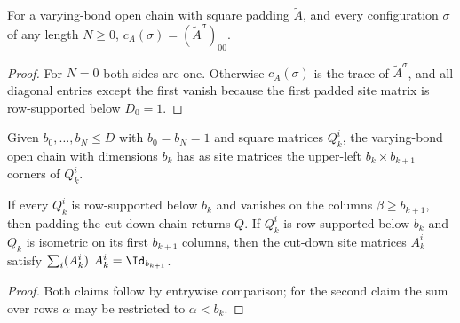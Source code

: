 \begin{lemma}
    \label{thm:seqanc_coeff_corner}
    \leanok
    For a varying-bond open chain with square padding $\widetilde A$, and
    every configuration $\sigma$ of any length $N\ge 0$,
    $c_A(\sigma)=(\widetilde A^\sigma)_{00}$.
\end{lemma}
\begin{proof}
    \leanok
    For $N=0$ both sides are one. Otherwise $c_A(\sigma)$ is the trace of
    $\widetilde A^\sigma$, and all diagonal entries except the first vanish
    because the first padded site matrix is row-supported below $D_0=1$.
\end{proof}

\begin{definition}
    \label{def:seqanc_cut_down}
    \leanok
    Given $b_0,\dots,b_N\le D$ with $b_0=b_N=1$ and square matrices $Q_k^i$,
    the varying-bond open chain with dimensions $b_k$ has as site matrices
    the upper-left $b_k\times b_{k+1}$ corners of $Q_k^i$.
\end{definition}

\begin{lemma}
    \label{thm:seqanc_cut_down}
    \leanok
    If every $Q_k^i$ is row-supported below $b_k$ and vanishes on the
    columns $\beta\ge b_{k+1}$, then padding the cut-down chain returns
    $Q$. If $Q_k^i$ is row-supported below $b_k$ and $Q_k$ is isometric on
    its first $b_{k+1}$ columns, then the cut-down site matrices $A_k^i$
    satisfy $\sum_i(A_k^i)^\dagger A_k^i=\Id_{b_{k+1}}$.
\end{lemma}
\begin{proof}
    \leanok
    Both claims follow by entrywise comparison; for the second claim the sum over rows $\alpha$
    may be restricted to $\alpha<b_k$.
\end{proof}

